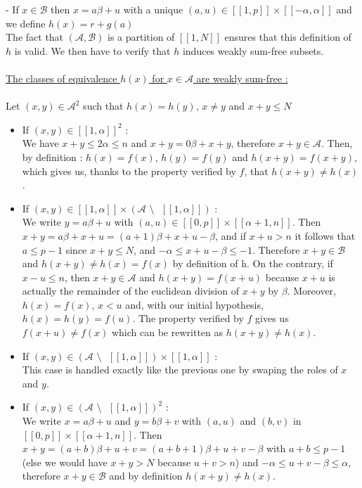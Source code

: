 \documentclass{article}
\newtheorem{computational theorem}{Computational Theorem}[section]
\begin{document}
- If $x \in \mathcal{B}$ then $x = a\beta + u$ with a unique $(a,u) \in [\![1,p]\!] \times [\![-\alpha,\alpha]\!]$ and we define $h(x) = r + g(a)$\\
The fact that $(\mathcal{A}, \mathcal{B})$ is a partition of $[\![1,N]\!]$ ensures that this definition of $h$ is valid. We then have to verify that $h$ induces weakly sum-free subsets.\\
\\
\underline{The classes of equivalence $h(x)$ for $x \in \mathcal{A}$ are weakly sum-free :}
\\
\\
Let $(x,y) \in \mathcal{A}^2$ such that $h(x) = h(y)$, $x \neq y$ and $x + y \leqslant N$
\begin{itemize}
\item If $(x,y) \in [\![1,\alpha]\!]^2$ :\\
We have $x + y \leqslant 2\alpha \leqslant n$ and $x + y = 0\beta + x + y$, therefore $x + y \in \mathcal{A}$. Then, by definition : $h(x) = f(x)$, $h(y) = f(y)$ and $h(x+y) = f(x+y)$, which gives us, thanks to the property verified by $f$, that $h(x+y) \neq h(x)$.
\item If $(x,y) \in [\![1,\alpha]\!] \times ( \mathcal{A} \text{ \textbackslash} \text{ } [\![1,\alpha]\!] )$ :\\
We write $y = a\beta + u$ with $(a,u) \in [\![0,p]\!] \times [\![\alpha + 1,n]\!]$. Then $x+y = a\beta + x + u = (a+1)\beta + x + u - \beta$, and if $x + u > n$ it follows that $a \leqslant p-1$ since $x+y \leqslant N$, and $-\alpha \leqslant x + u - \beta \leqslant -1$. Therefore $x+y \in \mathcal{B}$ and $h(x+y) \neq h(x) = f(x)$ by definition of h. On the contrary, if $x - u \leqslant n$, then $x+y \in \mathcal{A}$ and $h(x+y) = f(x+u)$ because $x+u$ is actually the remainder of the euclidean division of $x+y$ by $\beta$. Moreover, $h(x) = f(x)$, $x < u$ and, with our initial hypothesis, $h(x) = h(y) = f(u)$. The property verified by $f$ gives us $f(x+u) \neq f(x)$ which can be rewritten as $h(x+y) \neq h(x)$.
\item If $(x,y) \in ( \mathcal{A} \text{ \textbackslash} \text{ } [\![1,\alpha]\!] ) \times [\![1,\alpha]\!]$ : \\
This case is handled exactly like the previous one by swaping the roles of $x$ and $y$.
\item If $(x,y) \in ( \mathcal{A} \text{ \textbackslash} \text{ } [\![1,\alpha]\!] )^2$ : \\
We write $x = a\beta + u$ and $y = b\beta + v$ with $(a,u)$ and $(b,v)$ in $[\![0,p]\!] \times [\![\alpha + 1,n]\!]$. Then $x+y = (a+b)\beta + u+v = (a+b+1)\beta + u + v - \beta$ with $a+b \leqslant p-1$ (else we would have $x+y > N$ because $u+v > n$) and $-\alpha \leqslant u + v - \beta \leqslant \alpha$, therefore $x+y \in \mathcal{B}$ and by definition $h(x+y) \neq h(x)$.
\end{itemize}
\end{document}
